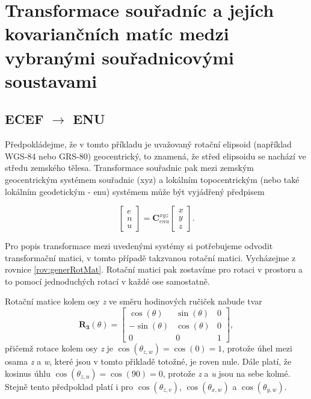 
\section{Transformace souřadníc a jejích kovariančních matíc medzi vybranými souřadnicovými soustavami}

\subsection{ECEF $\rightarrow$ ENU}
Předpokládejme, že v tomto příkladu je uvažovaný rotační elipsoid (například WGS-84 nebo GRS-80) geocentrický, to znamená, že střed elipsoidu se nachází ve středu zemského tělesa. Transformace souřadnic pak mezi zemským geocentrickým systémem souřadnic (xyz) a lokálním topocentrickým (nebo také lokálním geodetickým - enu) systémem může být vyjádřený předpisem \cite{Soler1998}

\begin{equation}
\begin{bmatrix}
e \\
n \\
u
\end{bmatrix} = 
\mathbf{C}_{enu}^{xyz}
\begin{bmatrix}
x \\
y \\
z
\end{bmatrix}.
\label{rov:ecef2enu1}
\end{equation}

Pro popis transformace mezi uvedenými systémy si potřebujeme odvodit transformační matici, v tomto případě takzvanou rotační matici. Vycházejme z rovnice \ref{rov:generRotMat}. Rotační matici pak zostavíme pro rotaci v prostoru a to pomocí jednoduchých rotací v každé ose samostatně.

Rotační matice kolem osy \textit{z} ve směru hodinových ručiček nabude tvar
\begin{equation}
\mathbf{R_{3}}\left(\theta\right) = 
\begin{bmatrix}
\cos{\left(\theta\right)} & \sin{\left(\theta\right)} & 0 \\
-\sin{\left(\theta\right)} & \cos{\left(\theta\right)} & 0 \\
0 & 0 & 1
\end{bmatrix},
\end{equation}
přičemž rotace kolem osy \textit{z} je $\cos{\left(\theta_{z, w} \right)} = \cos{\left(0\right)} = 1$, protože úhel mezi osama \textit{z} a \textit{w}, které jsou v tomto přikladě totožné, je roven nule. Dále platí, že kosinus úhlu $ \cos{\left(\theta_{z, u} \right)}= \cos{\left(90\right)} = 0 $, protože \textit {z} a \textit {u} jsou na sebe kolmé. Stejně tento předpoklad platí i pro $\cos{\left(\theta_{z,v}\right)}$, $\cos{\left(\theta_{x,w}\right)}$ a $\cos{\left(\theta_{y,w}\right)}$.

